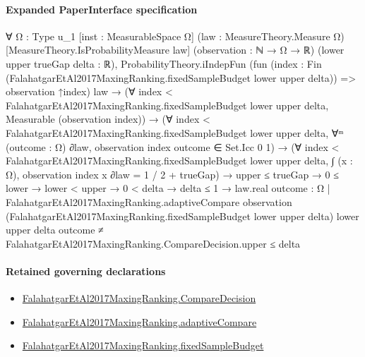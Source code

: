 \documentclass[10pt]{article}
\begin{document}
\paragraph{Expanded PaperInterface specification}
\begin{ReviewVerbatim}
∀ {Ω : Type u_1} [inst : MeasurableSpace Ω] (law : MeasureTheory.Measure Ω) [MeasureTheory.IsProbabilityMeasure law]
  (observation : ℕ → Ω → ℝ) (lower upper trueGap delta : ℝ),
  ProbabilityTheory.iIndepFun
      (fun (index : Fin (FalahatgarEtAl2017MaxingRanking.fixedSampleBudget lower upper delta)) => observation ↑index)
      law →
    (∀ index < FalahatgarEtAl2017MaxingRanking.fixedSampleBudget lower upper delta, Measurable (observation index)) →
      (∀ index < FalahatgarEtAl2017MaxingRanking.fixedSampleBudget lower upper delta,
          ∀ᵐ (outcome : Ω) ∂law, observation index outcome ∈ Set.Icc 0 1) →
        (∀ index < FalahatgarEtAl2017MaxingRanking.fixedSampleBudget lower upper delta,
            ∫ (x : Ω), observation index x ∂law = 1 / 2 + trueGap) →
          upper ≤ trueGap →
            0 ≤ lower →
              lower < upper →
                0 < delta →
                  delta ≤ 1 →
                    law.real
                        {outcome : Ω |
                          FalahatgarEtAl2017MaxingRanking.adaptiveCompare observation
                              (FalahatgarEtAl2017MaxingRanking.fixedSampleBudget lower upper delta) lower upper delta
                              outcome ≠
                            FalahatgarEtAl2017MaxingRanking.CompareDecision.upper} ≤
                      delta
\end{ReviewVerbatim}

\paragraph{Retained governing declarations}
\begin{itemize}\raggedright
\item \hyperlink{governing-declaration-3723216c72fc3dc8}{Falahatgar\allowbreak{}Et\allowbreak{}Al2017\allowbreak{}Maxing\allowbreak{}Ranking.\allowbreak{}Compare\allowbreak{}Decision}
\item \hyperlink{paper-prerequisite-8b894f32c9664991}{Falahatgar\allowbreak{}Et\allowbreak{}Al2017\allowbreak{}Maxing\allowbreak{}Ranking.\allowbreak{}adaptive\allowbreak{}Compare}
\item \hyperlink{governing-declaration-4b4daf4bb2493573}{Falahatgar\allowbreak{}Et\allowbreak{}Al2017\allowbreak{}Maxing\allowbreak{}Ranking.\allowbreak{}fixed\allowbreak{}Sample\allowbreak{}Budget}
\end{itemize}
\end{document}
